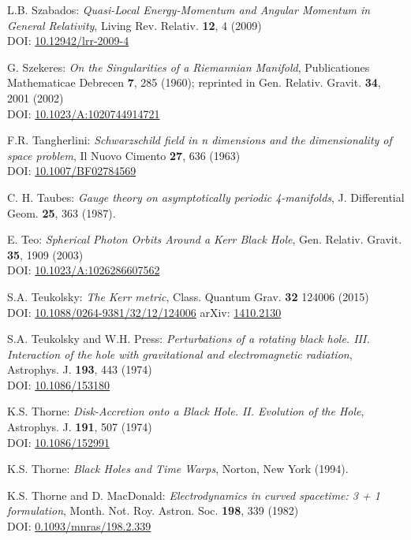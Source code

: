 \begin{thebibliography}{123}
L.B. Szabados:
{\em Quasi-Local Energy-Momentum and Angular Momentum in General Relativity},
Living Rev. Relativ. {\bf 12}, 4 (2009)\\
DOI: \href{https://doi.org/10.12942/lrr-2009-4}{10.12942/lrr-2009-4}

G. Szekeres:
{\em On the Singularities of a Riemannian Manifold},
Publicationes Mathematicae Debrecen {\bf 7}, 285 (1960); reprinted in
Gen. Relativ. Gravit. {\bf 34}, 2001 (2002)\\
DOI: \href{https://doi.org/10.1023/A:1020744914721}{10.1023/A:1020744914721}

F.R. Tangherlini:
{\em Schwarzschild field in n dimensions and the dimensionality of space problem},
Il Nuovo Cimento {\bf 27}, 636 (1963)\\
DOI: \href{https://doi.org/10.1007/BF02784569}{10.1007/BF02784569}

C. H. Taubes:
{\em Gauge theory on asymptotically periodic 4-manifolds},
J. Differential Geom. {\bf 25}, 363 (1987).

E. Teo:
{\em Spherical Photon Orbits Around a Kerr Black Hole},
Gen. Relativ. Gravit. {\bf 35}, 1909 (2003)\\
DOI: \href{https://doi.org/10.1023/A:1026286607562}{10.1023/A:1026286607562}

S.A. Teukolsky:
{\em The Kerr metric},
Class. Quantum Grav. {\bf 32} 124006 (2015)\\
DOI: \href{https://doi.org/10.1088/0264-9381/32/12/124006}{10.1088/0264-9381/32/12/124006}\hfill
arXiv: \href{https://arxiv.org/abs/1410.2130}{1410.2130}

S.A. Teukolsky and W.H. Press:
{\em Perturbations of a rotating black hole. III. Interaction of the hole with gravitational and electromagnetic radiation},
Astrophys. J. {\bf 193}, 443 (1974)\\
DOI: \href{https://doi.org/10.1086/153180}{10.1086/153180}

K.S. Thorne:
{\em Disk-Accretion onto a Black Hole. II. Evolution of the Hole},
Astrophys. J. {\bf 191}, 507 (1974)\\
DOI: \href{https://doi.org/10.1086/152991}{10.1086/152991}

K.S. Thorne:
{\em Black Holes and Time Warps},
Norton, New York (1994).

K.S. Thorne and D. MacDonald:
{\em Electrodynamics in curved spacetime: 3 + 1 formulation},
Month. Not. Roy. Astron. Soc. {\bf 198}, 339 (1982)\\
DOI: \href{https://doi.org/10.1093/mnras/198.2.339}{0.1093/mnras/198.2.339}


\end{thebibliography}
